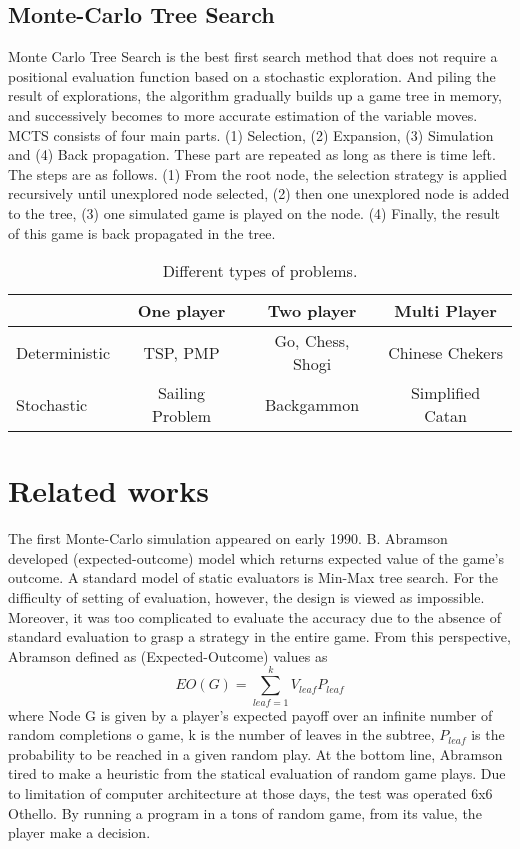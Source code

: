 \documentclass[11pt]{article}
\begin{document}
\subsection{Monte-Carlo Tree Search}
Monte Carlo Tree Search is the best first search method that does not require a positional evaluation function based on a stochastic exploration. And piling the result of explorations, the algorithm gradually builds up a game tree in memory, and successively becomes to more accurate estimation of the variable moves.  MCTS consists of four main parts. (1) Selection, (2) Expansion, (3) Simulation and (4) Back propagation. These part are repeated as long as there is time left. The steps are as follows. (1) From the root node,  the selection strategy is applied recursively until unexplored node selected, (2) then one unexplored node is added to the tree, (3) one simulated game is played on the node. (4) Finally, the result of this game is back propagated in the tree. 
\label{toolazytowritealonglabelexceptidid}


\begin{table}
\centering
\caption{Different types of problems.}
\begin{tabular}{| l || c | c | c |}
\hline
 & One player & Two player & Multi Player \\
   \hline 
Deterministic & TSP, PMP & Go, Chess, Shogi & Chinese Chekers\\
\hline
Stochastic & Sailing Problem & Backgammon & Simplified Catan\\

\hline
   \end{tabular}

\end{table}

\section{Related works}
The first Monte-Carlo simulation appeared on early 1990. B. Abramson developed (expected-outcome) model which returns expected value of the game’s outcome\cite{abramson1990expected}. A standard model of static evaluators is Min-Max tree search. For the difficulty of setting of evaluation, however, the design is viewed as impossible. Moreover, it was too complicated to evaluate the accuracy due to the absence of standard evaluation to grasp a strategy in the entire game. From this perspective, Abramson defined as (Expected-Outcome) values as 
\[EO(G) = \sum_{leaf=1}^{k} V_{leaf} P_{leaf}\]
where Node G is given by a player’s expected payoff over an infinite number of random completions o game, k is the number of leaves in the subtree, \(P_{leaf}\) is the probability to be reached in a given random play. At the bottom line, Abramson tired to make a heuristic from the statical evaluation of random game plays. Due to limitation of computer architecture at those days, the test was operated 6x6 Othello. By running a program in a tons of random game, from its value, the player make a decision. 
\end{document}
